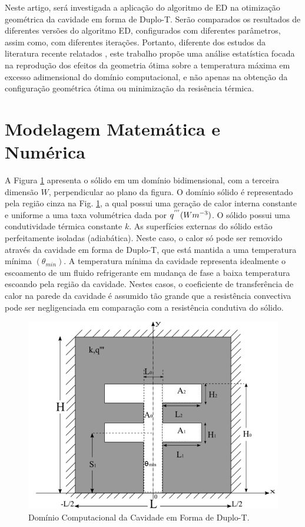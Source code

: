 \documentclass[12pt,A4,A4pt]{article}
\begin{document}
Neste artigo, será investigada a aplicação do algoritmo de ED na otimização geométrica da cavidade em forma de Duplo-T. Serão comparados os resultados de diferentes versões do algoritmo ED, configurados com diferentes parâmetros, assim como, com diferentes iterações. Portanto, diferente dos estudos da literatura recente relatados \citep{Gonzales2017, Gonzales2018}, este trabalho propõe uma análise estatística focada na reprodução dos efeitos da geometria ótima sobre a temperatura máxima em excesso adimensional do domínio computacional, e não apenas na obtenção da configuração geométrica ótima ou minimização da resisência térmica.

\section{Modelagem Matemática e Numérica}
\label{modelo}
\hspace{0.5cm}A Figura \ref{figure01} apresenta o sólido em um domínio bidimensional, com a terceira dimensão $W$, perpendicular ao plano da figura. O domínio sólido é representado pela região cinza na Fig. \ref{figure01}, a qual possui uma geração de calor interna constante e uniforme a uma taxa volumétrica dada por $q^{'''}(Wm^{\tiny -3})$. O sólido possui uma condutividade térmica constante $k$. As superfícies externas do sólido estão perfeitamente isoladas (adiabática). Neste caso, o calor só pode ser removido através da cavidade em forma de Duplo-T, que está mantida a uma temperatura mínima $(\theta_{min})$. A temperatura mínima da cavidade representa idealmente o escoamento de um fluido refrigerante em mudança de fase a baixa temperatura escoando pela região da cavidade. Nestes casos, o coeficiente de transferência de calor na parede da cavidade é assumido tão grande que a resistência convectiva pode ser negligenciada em comparação com a resistência condutiva do sólido. 

\begin{figure}[h!]
\centering
\includegraphics[width=0.6\linewidth]{imgs/duplo_t.png}
\caption{ {\small Domínio Computacional da Cavidade em Forma de Duplo-T.}}
\label{figure01}
\end{figure}
\end{document}
